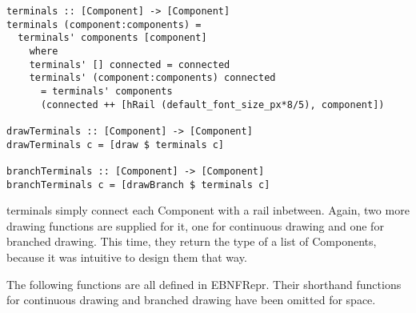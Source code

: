 \documentclass[a4paper]{article}
\begin{document}
\begin{verbatim}
terminals :: [Component] -> [Component]
terminals (component:components) =
  terminals' components [component]
    where
    terminals' [] connected = connected
    terminals' (component:components) connected
      = terminals' components 
      (connected ++ [hRail (default_font_size_px*8/5), component])
      
drawTerminals :: [Component] -> [Component]
drawTerminals c = [draw $ terminals c]

branchTerminals :: [Component] -> [Component]
branchTerminals c = [drawBranch $ terminals c]
\end{verbatim}

terminals simply connect each Component with a rail inbetween. Again, two more drawing functions are supplied for it, one for continuous drawing and one for branched drawing. This time, they return the type of a list of Components, because it was intuitive to design them that way.

The following functions are all defined in EBNFRepr. Their shorthand functions for continuous drawing and branched drawing have been omitted for space.
\end{document}
